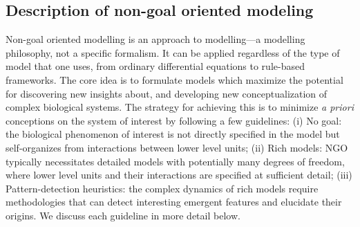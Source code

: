 \subsection{Description of non-goal oriented modeling}

Non-goal oriented modelling is an approach to modelling---a modelling philosophy, not a specific formalism. It can be applied regardless of the type of model that one uses, from ordinary differential equations to rule-based frameworks. The core idea is to formulate models which maximize the potential for discovering new insights about, and developing new conceptualization of complex biological systems. The strategy for achieving this is to minimize \emph{a priori} conceptions on the system of interest by following a few guidelines: (i) No goal: the biological phenomenon of interest is not directly specified in the model but self-organizes from interactions between lower level units; (ii) Rich models: NGO typically necessitates detailed models with potentially many degrees of freedom, where lower level units and their interactions are specified at sufficient detail; (iii) Pattern-detection heuristics: the complex dynamics of rich models require methodologies that can  detect interesting emergent features and elucidate their origins.  We discuss each guideline in more detail below.
  